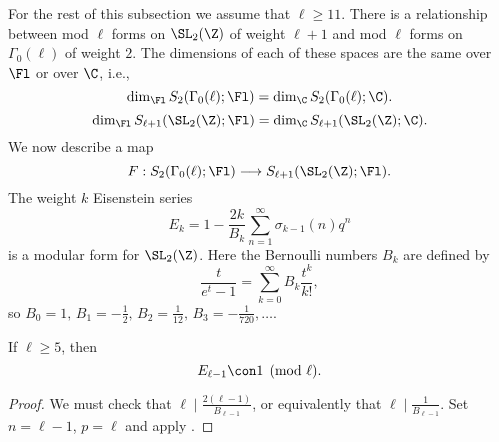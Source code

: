 \documentclass{report}
\begin{document}
For the rest of this subsection we assume that $\ell\geq 11$.
There is a relationship between mod $\ell$ forms on $\SL_2(\Z)$
of weight $\ell+1$ and mod $\ell$ forms on $\Gamma_0(\ell)$ of weight $2$.
The dimensions of each of these spaces are the same over
$\Fl$ or over $\C$, i.e.,
$$\dim_{\Fl}S_2(\Gamma_0(\ell);\Fl) = \dim_\C S_2(\Gamma_0(\ell);\C).$$
$$\dim_{\Fl}S_{\ell+1}(\SL_2(\Z);\Fl) = \dim_\C S_{\ell+1}(\SL_2(\Z);\C).$$
We now describe a map
  $$F:S_2(\Gamma_0(\ell);\Fl) \longrightarrow S_{\ell+1}(\SL_2(\Z);\Fl).$$
The weight $k$ Eisenstein series
$$E_{k} = 1 -\frac{2k}{B_k}
     \sum_{n=1}^{\infty} \sigma_{k-1}(n)q^n$$
is a modular form for $\SL_2(\Z)$.  Here the Bernoulli numbers
$B_k$ are defined by
$$\frac{t}{e^t-1} = \sum_{k=0}^{\infty} B_k\frac{t^k}{k!},$$
so $B_0 = 1,\, B_1=-\frac{1}{2}, \, B_2=\frac{1}{12}, \,
B_3=-\frac{1}{720},\ldots$.
\begin{proposition}
If $\ell\geq 5$, then
$$E_{\ell-1} \con 1 \pmod{\ell}.$$
\end{proposition}
\begin{proof}
We must check that $\ell\mid \frac{2(\ell-1)}{B_{\ell-1}}$,
or equivalently that $\ell\mid \frac{1}{B_{\ell-1}}$.
Set $n=\ell-1$, $p=\ell$ and apply \cite[X.2.2]{lang:modular}.
\end{proof}
\end{document}

